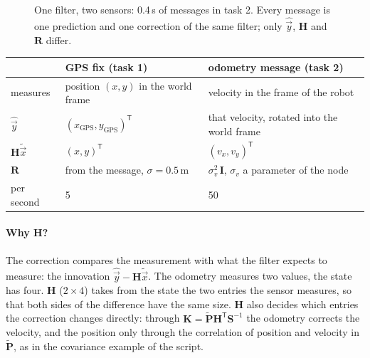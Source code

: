 \documentclass[11pt,a4paper,parskip=half]{scrartcl}
\newcommand{\thema}[1]{\texttt{#1}}
\newcommand{\mat}[1]{\mathbf{#1}}
\newcommand{\T}{^{\mathsf{T}}}
\begin{document}
\begin{figure}[ht]
  \centering
  \caption{One filter, two sensors: 0.4\,s of messages in task 2. Every message is one prediction and one
    correction of the same filter; only \(\hat{\vec y}\), \(\mat H\) and \(\mat R\) differ.}
  \label{fig:timeline}
\end{figure}

\begin{center}\small
\renewcommand{\arraystretch}{1.5}
\begin{tabular}{@{}lll@{}}
\toprule
& GPS fix (task 1) & odometry message (task 2) \\
\midrule
measures & position \((x, y)\) in the world frame & velocity in the frame of the robot \\
\(\hat{\vec y}\) & \((x_\text{GPS}, y_\text{GPS})\T\) & that velocity, rotated into the world frame \\
\(\mat H \tilde{\vec x}\) & \((x, y)\T\) & \((v_x, v_y)\T\) \\
\(\mat R\) & from the message, \(\sigma = 0.5\)\,m & \(\sigma_v^2\,\mat I\), \(\sigma_v\) a parameter of the node \\
per second & 5 & 50 \\
\bottomrule
\end{tabular}
\end{center}

\paragraph{Why \(\mat H\)?} The correction compares the measurement with what the filter expects to measure:
the innovation \(\hat{\vec y} - \mat H \tilde{\vec x}\). The odometry measures two values, the state has four.
\(\mat H\) (\(2 \times 4\)) takes from the state the two entries the sensor measures, so that both sides of the
difference have the same size. \(\mat H\) also decides which entries the correction changes directly: through
\(\mat K = \tilde{\mat P} \mat H\T \mat S^{-1}\) the odometry corrects the velocity, and the position only through
the correlation of position and velocity in \(\tilde{\mat P}\), as in the covariance example of the script.
\end{document}
